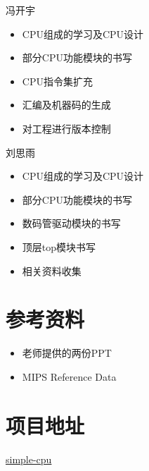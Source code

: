\documentclass[UTF8]{article}
\begin{document}
冯开宇
\begin{itemize}
    \item CPU组成的学习及CPU设计
    \item 部分CPU功能模块的书写
    \item CPU指令集扩充
\item 汇编及机器码的生成
\item 对工程进行版本控制
\end{itemize}


刘思雨
\begin{itemize}
\item CPU组成的学习及CPU设计
\item 部分CPU功能模块的书写
\item 数码管驱动模块的书写
\item 顶层top模块书写
\item 相关资料收集
\end{itemize}

\section{参考资料}

\begin{itemize}
    \item 老师提供的两份PPT
    \item MIPS Reference Data
\end{itemize}

\section{项目地址}

\href{https://github.com/bit-logic-computer-design-2019/simple-cpu}{simple-cpu}
\end{document}
